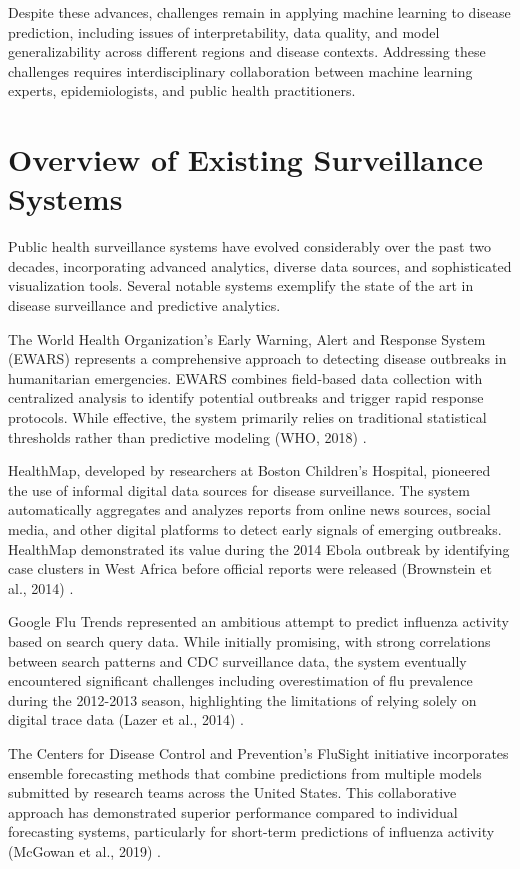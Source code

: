 \documentclass[12pt,a4paper]{report}
\begin{document}
Despite these advances, challenges remain in applying machine learning to disease prediction, including issues of interpretability, data quality, and model generalizability across different regions and disease contexts. Addressing these challenges requires interdisciplinary collaboration between machine learning experts, epidemiologists, and public health practitioners.

\section{Overview of Existing Surveillance Systems}
Public health surveillance systems have evolved considerably over the past two decades, incorporating advanced analytics, diverse data sources, and sophisticated visualization tools. Several notable systems exemplify the state of the art in disease surveillance and predictive analytics.

The World Health Organization's Early Warning, Alert and Response System (EWARS) represents a comprehensive approach to detecting disease outbreaks in humanitarian emergencies. EWARS combines field-based data collection with centralized analysis to identify potential outbreaks and trigger rapid response protocols. While effective, the system primarily relies on traditional statistical thresholds rather than predictive modeling (WHO, 2018) \cite{who2018early}.

HealthMap, developed by researchers at Boston Children's Hospital, pioneered the use of informal digital data sources for disease surveillance. The system automatically aggregates and analyzes reports from online news sources, social media, and other digital platforms to detect early signals of emerging outbreaks. HealthMap demonstrated its value during the 2014 Ebola outbreak by identifying case clusters in West Africa before official reports were released (Brownstein et al., 2014) \cite{brownstein2014digital}.

Google Flu Trends represented an ambitious attempt to predict influenza activity based on search query data. While initially promising, with strong correlations between search patterns and CDC surveillance data, the system eventually encountered significant challenges including overestimation of flu prevalence during the 2012-2013 season, highlighting the limitations of relying solely on digital trace data (Lazer et al., 2014) \cite{lazer2014parable}.

The Centers for Disease Control and Prevention's FluSight initiative incorporates ensemble forecasting methods that combine predictions from multiple models submitted by research teams across the United States. This collaborative approach has demonstrated superior performance compared to individual forecasting systems, particularly for short-term predictions of influenza activity (McGowan et al., 2019) \cite{mcgowan2019collaborative}.
\end{document}
